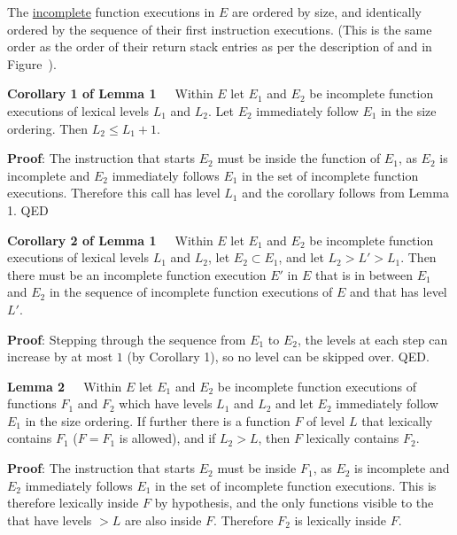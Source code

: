 \documentclass[12pt]{article}
\begin{document}
The \underline{incomplete} function executions in $E$ are ordered by size, and
identically ordered by the sequence of their first instruction executions.
(This is the same order as the order of their return stack entries
as per the description of  and  in
Figure~).

\begin{indpar}
{\bf Corollary 1 of Lemma 1}~~~Within $E$
let $E_1$ and $E_2$ be incomplete function
executions of lexical levels
$L_1$ and $L_2$.  Let $E_2$ immediately follow $E_1$ in the size
ordering.  Then $L_2\leq L_1+1$.
\end{indpar}
\begin{indpar}
{\bf Proof}: The  instruction that starts $E_2$ must be
inside the function of $E_1$, as $E_2$ is incomplete
and $E_2$ immediately follows $E_1$ in the set of incomplete
function executions.  Therefore this call has level $L_1$ and
the corollary follows from Lemma 1. QED
\end{indpar}

\begin{indpar}
{\bf Corollary 2 of Lemma 1}~~~Within $E$
let $E_1$ and $E_2$ be incomplete function
executions of lexical levels
$L_1$ and $L_2$, let $E_2\subset E_1$, and let $L_2>L'>L_1$.
Then there must be an incomplete function execution $E'$ in $E$
that is in between $E_1$ and $E_2$ in the sequence of incomplete function
executions of $E$ and that has level $L'$.
\end{indpar}
\begin{indpar}
{\bf Proof}: Stepping through the sequence from $E_1$ to $E_2$,
the levels at each step can increase by at most $1$ (by Corollary 1),
so no level can be skipped over.  QED.
\end{indpar}

\begin{indpar}
{\bf Lemma 2}~~~Within $E$
let $E_1$ and $E_2$ be incomplete function
executions of functions $F_1$ and $F_2$ which have levels $L_1$ and $L_2$
and let  $E_2$ immediately follow $E_1$ in the size
ordering.  If further there is a function $F$ of level $L$ that lexically
contains $F_1$ ($F=F_1$ is allowed), and if $L_2>L$, then $F$ lexically contains
$F_2$.
\end{indpar}
\begin{indpar}
{\bf Proof}: The  instruction that starts $E_2$ must be
inside $F_1$, as $E_2$ is incomplete
and $E_2$ immediately follows $E_1$ in the set of incomplete
function executions.
This 
is therefore lexically inside $F$ by hypothesis, and the only functions visible
to the  that have levels $>L$ are also inside $F$.
Therefore $F_2$ is lexically inside $F$.
\end{indpar}
\end{document}

